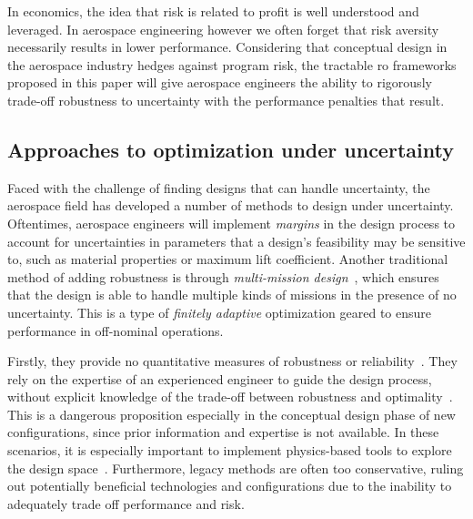 In economics, the idea that risk is related to profit is well understood and leveraged.
In aerospace engineering however we often forget that risk aversity necessarily results in lower performance.
Considering that conceptual design in the aerospace industry hedges against program risk,
the tractable \gls{ro} frameworks proposed in this paper will
give aerospace engineers the ability to rigorously trade-off robustness to uncertainty with the performance penalties
that result.

\subsection{Approaches to optimization under uncertainty}
\label{sec:approaches}

Faced with the challenge of finding designs that can handle uncertainty,
the aerospace field has developed a number of methods to
design under uncertainty. Oftentimes, aerospace engineers will implement
\emph{margins} in the design process to account for uncertainties in parameters that a design's feasibility
may be sensitive to, such as material properties or maximum lift coefficient.
Another traditional method of adding robustness is through \emph{multi-mission design}~\cite{York2018},
which ensures that the design is able to handle
multiple kinds of missions in the presence of no uncertainty. This is a type of \emph{finitely
adaptive} optimization geared to ensure performance in off-nominal operations.

Firstly, they provide no quantitative measures of
robustness or reliability~\cite{Zang2002}. They rely on the expertise of an experienced
engineer to guide the design process, without explicit knowledge of the trade-off between
robustness and optimality~\cite{Yao2011}. This is a dangerous proposition especially in the
conceptual design phase of new configurations, since prior information and expertise is not
available. In these scenarios, it is especially important to implement physics-based tools
to explore the design space~\cite{York2018}. Furthermore,
legacy methods are often too conservative, ruling out potentially beneficial technologies
and configurations due to the inability to adequately trade off performance and risk.

